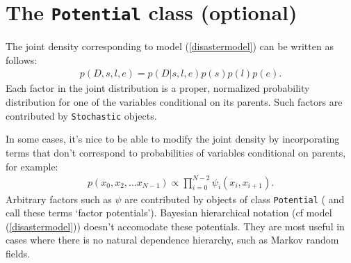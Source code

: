 \section{The \texttt{Potential} class (optional)}

% 

The joint density corresponding to model (\ref{disastermodel}) can be written as follows:
\begin{eqnarray*}
    p(D,s,l,e) = p(D|s,l,e) p(s) p(l) p(e).
\end{eqnarray*}
Each factor in the joint distribution is a proper, normalized probability distribution for one of the variables conditional on its parents. Such factors are contributed by \texttt{Stochastic} objects.

In some cases, it's nice to be able to modify the joint density by incorporating terms that don't correspond to probabilities of variables conditional on parents, for example:
\begin{eqnarray*}
    p(x_0, x_2, \ldots x_{N-1}) \propto \prod_{i=0}^{N-2} \psi_i(x_i, x_{i+1}).
\end{eqnarray*}
Arbitrary factors such as $\psi$ are contributed by objects of class \texttt{Potential} (\cite{dawidmarkov} and \cite{jordangraphical} call these terms `factor potentials'). Bayesian hierarchical notation (cf model (\ref{disastermodel})) doesn't accomodate these potentials. They are most useful in cases where there is no natural dependence hierarchy, such as Markov random fields.

